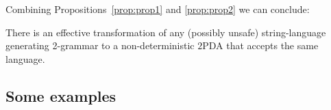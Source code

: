 Combining Propositions~\ref{prop:prop1} and \ref{prop:prop2} we can
conclude:
\begin{theorem}
There is an effective transformation of any (possibly unsafe)
string-language generating 2-grammar to a non-deterministic $2$PDA that
accepts the same language. \myendproof
\end{theorem}



\subsection{Some examples}

